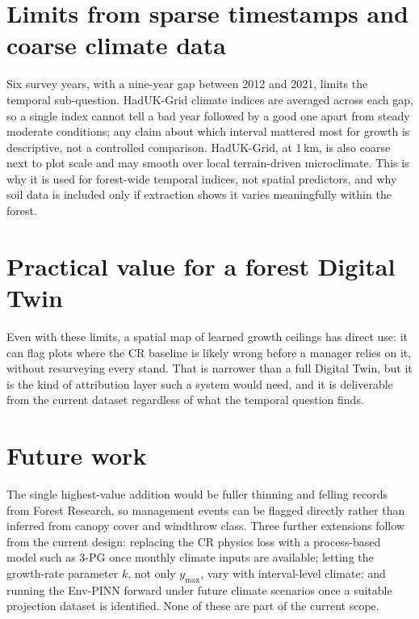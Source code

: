 \section{Limits from sparse timestamps and coarse climate data}

Six survey years, with a nine-year gap between 2012 and 2021, limits the temporal sub-question. HadUK-Grid climate indices are averaged across each gap, so a single index cannot tell a bad year followed by a good one apart from steady moderate conditions; any claim about which interval mattered most for growth is descriptive, not a controlled comparison. HadUK-Grid, at 1\,km, is also coarse next to plot scale and may smooth over local terrain-driven microclimate. This is why it is used for forest-wide temporal indices, not spatial predictors, and why soil data is included only if extraction shows it varies meaningfully within the forest.

\section{Practical value for a forest Digital Twin}

Even with these limits, a spatial map of learned growth ceilings has direct use: it can flag plots where the CR baseline is likely wrong before a manager relies on it, without resurveying every stand. That is narrower than a full Digital Twin, but it is the kind of attribution layer such a system would need, and it is deliverable from the current dataset regardless of what the temporal question finds.

\section{Future work}
\label{sec:future-work}

The single highest-value addition would be fuller thinning and felling records from Forest Research, so management events can be flagged directly rather than inferred from canopy cover and windthrow class. Three further extensions follow from the current design: replacing the CR physics loss with a process-based model such as 3-PG once monthly climate inputs are available; letting the growth-rate parameter $k$, not only $y_{\max}$, vary with interval-level climate; and running the Env-PINN forward under future climate scenarios once a suitable projection dataset is identified. None of these are part of the current scope.
